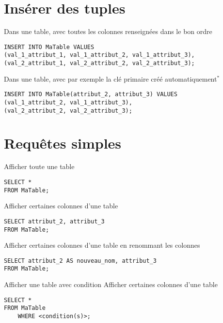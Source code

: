 \documentclass[a4paper,10pt,article]{nsi}
\begin{document}
\section*{Insérer des tuples}

Dans une table, avec toutes les colonnes renseignées dans le bon ordre
\begin{sql}
    \begin{verbatim}
INSERT INTO MaTable VALUES
(val_1_attribut_1, val_1_attribut_2, val_1_attribut_3),
(val_2_attribut_1, val_2_attribut_2, val_2_attribut_3);
\end{verbatim}
\end{sql}

Dans une table, avec par exemple la clé primaire créé automatiquement$^*$
\begin{sql}
    \begin{verbatim}
INSERT INTO MaTable(attribut_2, attribut_3) VALUES
(val_1_attribut_2, val_1_attribut_3),
(val_2_attribut_2, val_2_attribut_3);
\end{verbatim}
\end{sql}

\section*{Requêtes simples}

Afficher toute une table
\begin{sql}
    \begin{verbatim}
SELECT * 
FROM MaTable;
\end{verbatim}
\end{sql}

Afficher certaines colonnes d'une table
\begin{sql}
    \begin{verbatim}
SELECT attribut_2, attribut_3 
FROM MaTable;
\end{verbatim}
\end{sql}

Afficher certaines colonnes d'une table en renommant les colonnes
\begin{sql}
    \begin{verbatim}
SELECT attribut_2 AS nouveau_nom, attribut_3 
FROM MaTable;
\end{verbatim}
\end{sql}

Afficher une table avec condition
Afficher certaines colonnes d'une table
\begin{sql}
    \begin{verbatim}
SELECT * 
FROM MaTable
    WHERE <condition(s)>;
\end{verbatim}
\end{sql}
\end{document}
